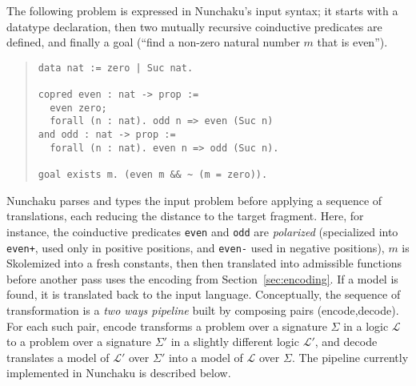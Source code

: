 The following problem is expressed in Nunchaku's input syntax; it starts with
a datatype declaration, then two mutually recursive coinductive predicates
are defined, and finally a goal (``find a non-zero natural number $m$ that
is even'').
\begin{quote}
\begin{verbatim}
data nat := zero | Suc nat.

copred even : nat -> prop :=
  even zero;
  forall (n : nat). odd n => even (Suc n)
and odd : nat -> prop :=
  forall (n : nat). even n => odd (Suc n).

goal exists m. (even m && ~ (m = zero)).
\end{verbatim}
\end{quote}

Nunchaku parses and types the input problem before applying a sequence
of translations, each reducing the distance to the target fragment. Here,
for instance, the coinductive predicates
\verb!even! and \verb!odd! are \emph{polarized} (specialized into
\verb!even+!, used only in positive positions, and \verb!even-! used in negative
positions),
$m$ is Skolemized into a fresh constants,
then then translated into admissible functions
before another pass uses the encoding from Section~\ref{sec:encoding}.
If a model is found, it is translated back to the input language.
Conceptually, the sequence of transformation is a \emph{two ways pipeline}
built by composing pairs \textsf{(encode,decode)}.
For each such pair, \textsf{encode}
transforms a problem over a signature $\Sigma$ in a logic
$\mathcal{L}$ to a problem over a signature $\Sigma'$ in a slightly different
logic $\mathcal{L}'$, and \textsf{decode} translates a model of $\mathcal{L'}$
over $\Sigma'$ into a model of $\mathcal{L}$ over $\Sigma$. The pipeline
currently implemented in Nunchaku is described below.

